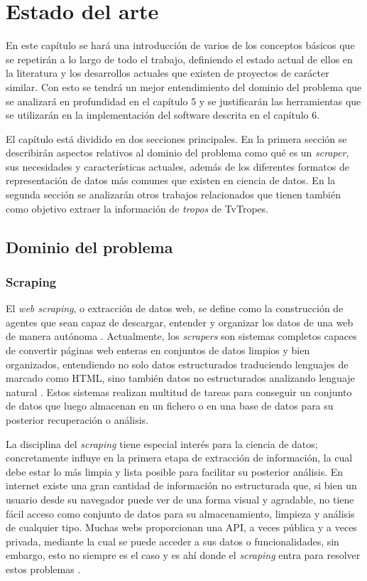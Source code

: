 \chapter{Estado del arte}

En este capítulo se hará una introducción de varios de los conceptos básicos que
se repetirán a lo largo de todo el trabajo, definiendo el estado actual de ellos
en la literatura y los desarrollos actuales que existen de proyectos de carácter
similar. Con esto se tendrá un mejor entendimiento del dominio del problema que
se analizará en profundidad en el capítulo 5 y se justificarán las herramientas
que se utilizarán en la implementación del software descrita en el capítulo 6.

El capítulo está dividido en dos secciones principales. En la primera sección se
describirán aspectos relativos al dominio del problema como qué es un
\textit{scraper}, sus necesidades y características actuales, además de los
diferentes formatos de representación de datos más comunes que existen en
ciencia de datos. En la segunda sección se analizarán otros trabajos
relacionados que tienen también como objetivo extraer la información de
\textit{tropos} de TvTropes. 

\section{Dominio del problema}
\subsection{Scraping}
El \textit{web scraping}, o extracción de datos web, se define como la
construcción de agentes que sean capaz de descargar, entender y organizar los
datos de una web de manera autónoma \cite{apress2018scraping}. Actualmente, los
\textit{scrapers} son sistemas completos capaces de convertir páginas web
enteras en conjuntos de datos limpios y bien organizados, entendiendo no solo
datos estructurados traduciendo lenguajes de marcado como HTML, sino también
datos no estructurados analizando lenguaje natural \cite{zhao2017web}. Estos
sistemas realizan multitud de tareas para conseguir un conjunto de datos que
luego almacenan en un fichero o en una base de datos para su posterior
recuperación o análisis.

La disciplina del \textit{scraping} tiene especial interés para la ciencia de
datos; concretamente influye en la primera etapa de extracción de información,
la cual debe estar lo más limpia y lista posible para facilitar su posterior
análisis. En internet existe una gran cantidad de información no estructurada
que, si bien un usuario desde su navegador puede ver de una forma visual y
agradable, no tiene fácil acceso como conjunto de datos para su almacenamiento,
limpieza y análisis de cualquier tipo. Muchas webs proporcionan una API, a veces
pública y a veces privada, mediante la cual se puede acceder a sus datos o
funcionalidades, sin embargo, esto no siempre es el caso y es ahí donde el
\textit{scraping} entra para resolver estos problemas \cite{apress2018scraping}.

